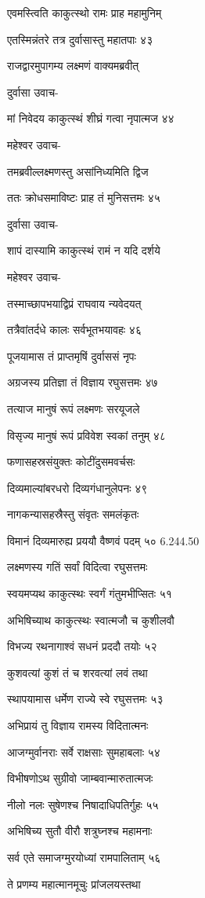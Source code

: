 एवमस्त्विति काकुत्स्थो रामः प्राह महामुनिम्

एतस्मिन्नंतरे तत्र दुर्वासास्तु महातपाः ४३

राजद्वारमुपागम्य लक्ष्मणं वाक्यमब्रवीत्

दुर्वासा उवाच-

मां निवेदय काकुत्स्थं शीघ्रं गत्वा नृपात्मज ४४

महेश्वर उवाच-

तमब्रवील्लक्ष्मणस्तु असांनिध्यमिति द्विज

ततः क्रोधसमाविष्टः प्राह तं मुनिसत्तमः ४५

दुर्वासा उवाच-

शापं दास्यामि काकुत्स्थं रामं न यदि दर्शये

महेश्वर उवाच-

तस्माच्छापभयाद्विप्रं राघवाय न्यवेदयत्

तत्रैवांतर्दधे कालः सर्वभूतभयावहः ४६

पूजयामास तं प्राप्तमृषिं दुर्वाससं नृपः

अग्रजस्य प्रतिज्ञा तं विज्ञाय रघुसत्तमः ४७

तत्याज मानुषं रूपं लक्ष्मणः सरयूजले

विसृज्य मानुषं रूपं प्रविवेश स्वकां तनुम् ४८

फणासहस्रसंयुक्तः कोटींदुसमवर्चसः

दिव्यमाल्यांबरधरो दिव्यगंधानुलेपनः ४९

नागकन्यासहस्रैस्तु संवृतः समलंकृतः

विमानं दिव्यमारुह्य प्रययौ वैष्णवं पदम् ५० 6.244.50

लक्ष्मणस्य गतिं सर्वां विदित्वा रघुसत्तमः

स्वयमप्यथ काकुत्स्थः स्वर्गं गंतुमभीप्सितः ५१

अभिषिच्याथ काकुत्स्थः स्वात्मजौ च कुशीलवौ

विभज्य रथनागाश्वं सधनं प्रददौ तयोः ५२

कुशवत्यां कुशं तं च शरवत्यां लवं तथा

स्थापयामास धर्मेण राज्ये स्वे रघुसत्तमः ५३

अभिप्रायं तु विज्ञाय रामस्य विदितात्मनः

आजग्मुर्वानराः सर्वे राक्षसाः सुमहाबलाः ५४

विभीषणोऽथ सुग्रीवो जाम्बवान्मारुतात्मजः

नीलो नलः सुषेणश्च निषादाधिपतिर्गुहः ५५

अभिषिच्य सुतौ वीरौ शत्रुघ्नश्च महामनाः

सर्व एते समाजग्मुरयोध्यां रामपालिताम् ५६

ते प्रणम्य महात्मानमूचुः प्रांजलयस्तथा

